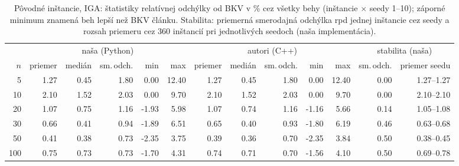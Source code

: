 \begin{table}[ht]
\centering
\scriptsize\setlength{\tabcolsep}{3pt}
\caption{Pôvodné inštancie, IGA: štatistiky relatívnej odchýlky od BKV v \% cez všetky behy (inštancie $\times$ seedy 1--10); záporné minimum znamená beh lepší než BKV článku. Stabilita: priemerná smerodajná odchýlka rpd jednej inštancie cez seedy a rozsah priemeru cez 360 inštancií pri jednotlivých seedoch (naša implementácia).}
\label{tab:orig_rpd_stats}
\begin{tabular}{r|rrrrr|rrrrr|rr}
\toprule
 & \multicolumn{5}{c|}{naša (Python)} & \multicolumn{5}{c|}{autori (C++)} & \multicolumn{2}{c}{stabilita (naša)} \\
$n$ & priemer & medián & sm.\,odch. & min & max & priemer & medián & sm.\,odch. & min & max & sm.\,odch. & priemer seedu \\
\midrule
5 & 1.27 & 0.45 & 1.80 & 0.00 & 12.40 & 1.27 & 0.45 & 1.80 & 0.00 & 12.40 & 0.00 & 1.27--1.27 \\
10 & 2.10 & 1.52 & 2.03 & 0.00 & 9.70 & 2.10 & 1.52 & 2.03 & 0.00 & 9.70 & 0.00 & 2.10--2.10 \\
20 & 1.07 & 0.75 & 1.16 & -1.93 & 5.98 & 1.07 & 0.74 & 1.16 & -1.16 & 5.66 & 0.14 & 1.05--1.08 \\
30 & 0.66 & 0.41 & 0.94 & -1.89 & 6.51 & 0.65 & 0.40 & 0.93 & -1.80 & 6.19 & 0.46 & 0.63--0.68 \\
50 & 0.41 & 0.38 & 0.73 & -2.35 & 3.75 & 0.39 & 0.36 & 0.70 & -2.35 & 3.84 & 0.50 & 0.38--0.45 \\
100 & 0.75 & 0.73 & 0.73 & -1.70 & 4.31 & 0.74 & 0.71 & 0.70 & -1.56 & 4.10 & 0.50 & 0.69--0.78 \\
\bottomrule
\end{tabular}
\end{table}
